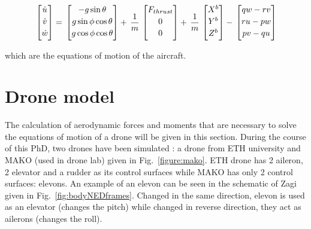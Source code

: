 \begin{equation}{\label{eqn:dynamicsEquation2}}
\begin{bmatrix}
\dot{u}\\[0.2em]
\dot{v}\\[0.2em]
\dot{w}\\[0.2em]
\end{bmatrix}
=\,
\begin{bmatrix}
{-g \sin{\theta}}\\[0.2em]
{g \sin{\phi} \cos{\theta} }\\[0.2em]
{g \cos{\phi} \cos{\theta}}\\[0.2em]
\end{bmatrix}
+\,
\frac{1}{m}
\,
\begin{bmatrix}
F_{thrust}\\[0.2em]
0\\[0.2em]
0\\[0.2em]
\end{bmatrix}
+\,
\frac{1}{m}
\,
\begin{bmatrix}
X^b\\[0.2em]
Y^b\\[0.2em]
Z^b\\[0.2em]
\end{bmatrix}
-\,
\begin{bmatrix}
qw-rv\\[0.2em]
ru-pw\\[0.2em]
pv-qu\\[0.2em]
\end{bmatrix}
\end{equation}

which are the equations of motion of the aircraft. 

\section{Drone model}

The calculation of aerodynamic forces and moments that are necessary to solve the equations of motion of a drone will be given in this section. 
During the course of this PhD, two drones have been simulated : a drone from ETH university \cite{ducard2009fault} and MAKO (used in drone lab) given in Fig.~\ref{figure:mako}. 
ETH drone has 2 aileron, 2 elevator and a rudder as its control surfaces while MAKO has only 2 control surfaces: elevons. 
An example of an elevon can be seen in the schematic of Zagi given in Fig.~\ref{fig:bodyNEDframes}. 
Changed in the same direction, elevon is used as an elevator (changes the pitch) while changed in reverse direction, they act as ailerons (changes the roll). 

